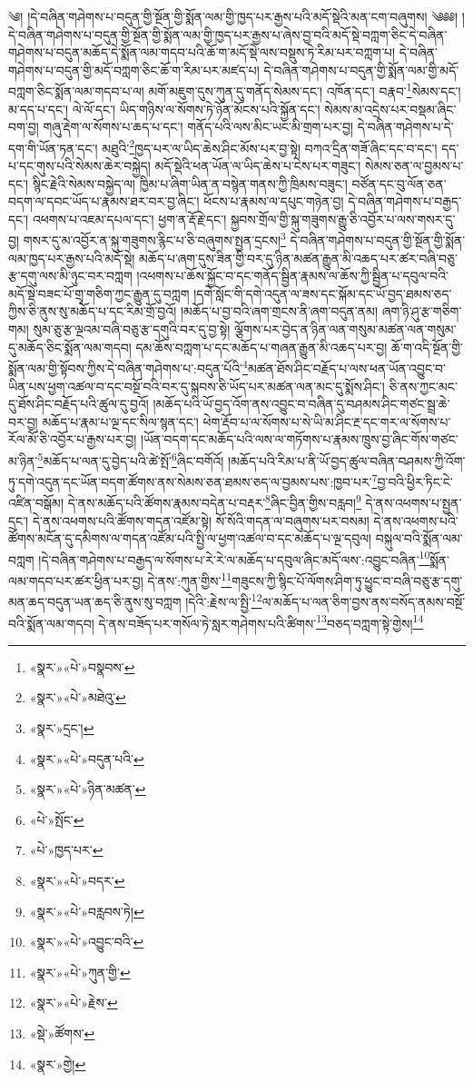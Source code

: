༄། །དེ་བཞིན་གཤེགས་པ་བདུན་གྱི་སྔོན་གྱི་སྨོན་ལམ་གྱི་ཁྱད་པར་རྒྱས་པའི་མདོ་སྡེའི་མན་ངག་བཞུགས། ༄༅༅། །དེ་བཞིན་གཤེགས་པ་བདུན་གྱི་སྔོན་གྱི་སྨོན་ལམ་གྱི་ཁྱད་པར་རྒྱས་པ་ཞེས་བྱ་བའི་མདོ་སྡེ་བཀླག་ཅིང་དེ་བཞིན་གཤེགས་པ་བདུན་མཆོད་དེ་སྨོན་ལམ་གདབ་པའི་ཆོ་ག་མདོ་སྡེ་ལས་བསྡུས་ཏེ་རིམ་པར་བཀླག་པ། དེ་བཞིན་གཤེགས་པ་བདུན་གྱི་མདོ་བཀླག་ཅིང་ཆོ་ག་རིམ་པར་མཛད་པ། དེ་བཞིན་གཤེགས་པ་བདུན་གྱི་སྨོན་ལམ་གྱི་མདོ་བཀླག་ཅིང་སྨོན་ལམ་གདབ་པ་ལ། མགོ་མཇུག་དུས་ཀུན་དུ་གནོད་སེམས་དང་། འཁོན་དང་། བརྣབ་\footnote{«སྣར་»«པེ་»བསྣབས་}སེམས་དང་། མ་དད་པ་དང་། ལེ་ལོ་དང་། ཡིད་གཉིས་ལ་སོགས་ཏེ་ཉོན་མོངས་པའི་སྐྱོན་དང་། སེམས་མ་འདྲེས་པར་བསྡམ་ཞིང་བག་བྱ། གཞུ་རྡེག་ལ་སོགས་པ་ཆད་པ་དང་། གནོད་པའི་ལས་མིང་ཡང་མི་གྲག་པར་བྱ། དེ་བཞིན་གཤེགས་པ་དེ་དག་གི་ཡོན་ཏན་དང་། མཐུའི་\footnote{«སྣར་»«པེ་»མཐེའུ་}ཁྱད་པར་ལ་ཡིད་ཆེས་ཤིང་མོས་པར་བྱ་སྟེ། བཀའ་དྲིན་གཟོ་ཞིང་དང་བ་དང་། དད་པ་དང་གུས་པའི་སེམས་ཆེར་བསྐྱེད། མདོ་སྡེའི་ཕན་ཡོན་ལ་ཡིད་ཆེས་པ་ངེས་པར་གཟུང་། སེམས་ཅན་ལ་བྱམས་པ་དང་། སྙིང་རྗེའི་སེམས་བསྐྱེད་ལ། ཁྱིམ་པ་ཞིག་ཡིན་ན་བསྙེན་གནས་ཀྱི་ཁྲིམས་བཟུང་། བཙོན་དང་བུ་ལོན་ཅན་བདག་ལ་དབང་ཡོད་པ་རྣམས་ཐར་བར་བྱ་ཞིང་། ཕོངས་པ་རྣམས་ལ་དཔུང་གཉེན་བྱ། དེ་བཞིན་གཤེགས་པ་བརྒྱད་དང་། འཕགས་པ་འཇམ་དཔལ་དང་། ཕྱག་ན་རྡོ་རྗེ་དང་། སྐྱབས་གྲོལ་གྱི་སྐུ་གཟུགས་རྒྱུ་ཅི་འབྱོར་པ་ལས་གསར་དུ་བྱ། གསར་དུ་མ་འབྱོར་ན་སྐུ་གཟུགས་རྙིང་པ་ཅི་བཞུགས་སྤྱན་དྲངས།\footnote{«སྣར་»དྲང་།} དེ་བཞིན་གཤེགས་པ་བདུན་གྱི་སྔོན་གྱི་སྨོན་ལམ་ཁྱད་པར་རྒྱས་པའི་མདོ་སྡེ། མཆོད་པ་ཞག་དུས་ཟིན་གྱི་བར་དུ་ཉིན་མཚན་རྒྱུན་མི་འཆད་པར་ཚར་བཞི་བཅུ་རྩ་དགུ་ལས་མི་ཉུང་བར་བཀླག །འཕགས་པ་ཆོས་སྐྱོང་བ་དང་གནོད་སྦྱིན་རྣམས་ལ་ཆོས་ཀྱི་སྦྱིན་པ་དབུལ་བའི་མདོ་སྡེ་བཟང་པོ་གྲྭ་གཅིག་ཀྱང་རྒྱུན་དུ་བཀླག །དགེ་སློང་གི་དགེ་འདུན་ལ་ཟས་དང་སྐོམ་དང་ཡོ་བྱད་ཐམས་ཅད་ཀྱིས་ཅི་ནུས་སུ་མཆོད་པ་དང་རིམ་གྲོ་བྱའོ། །མཆོད་པ་བྱ་བའི་ཞག་གྲངས་ནི་ཞག་བདུན་ནམ། ཞག་ཉི་ཤུ་རྩ་གཅིག་གམ། སུམ་ཅུ་རྩ་ལྔའམ་བཞི་བཅུ་རྩ་དགུའི་བར་དུ་བྱ་སྟེ། ལྕོགས་པར་བྱེད་ན་ཉིན་ལན་གསུམ་མཚན་ལན་གསུམ་དུ་མཆོད་ཅིང་སྨོན་ལམ་གདབ། དམ་ཆོས་བཀླག་པ་དང་མཆོད་པ་གཞན་རྒྱུན་མི་འཆད་པར་བྱ། ཆོ་ག་འདི་སྔོན་གྱི་སྨོན་ལམ་གྱི་སྟོབས་ཀྱིས་དེ་བཞིན་གཤེགས་པ་:བདུན་པོའི་\footnote{«སྣར་»«པེ་»བདུན་པའི་}མཚན་ཐོས་ཤིང་བརྗོད་པ་ལས་ཕན་ཡོན་འབྱུང་བ་ཡིན་པས་ཕྱག་འཚལ་བ་དང་བསྔོ་བའི་བར་དུ་སྐབས་ཅི་ཡོད་པར་མཚན་ལན་མང་དུ་སྨོས་ཤིང་། ཅི་ནས་ཀྱང་མང་དུ་ཐོས་ཤིང་བརྗོད་པའི་ཚུལ་དུ་བྱའོ། །མཆོད་པའི་ཡོ་བྱད་འོག་ནས་འབྱུང་བ་བཞིན་དུ་བཤམས་ཤིང་གཙང་སྦྲ་ཆེ་བར་བྱ། མཆོད་པ་རྣམ་པ་ལྔ་དང་སིལ་སྙན་དང་། ཕེག་རྡོབ་པ་ལ་སོགས་པ་སེ་ཡི་མ་ཤིང་རྔ་དང་གར་ལ་སོགས་པ་རོལ་མོ་ཅི་འབྱོར་པ་རྒྱས་པར་བྱ། །ཡོན་བདག་དང་མཆོད་པའི་ལས་ལ་གཏོགས་པ་རྣམས་ཁྲུས་བྱ་ཞིང་གོས་གཙང་མ་ཉིན་\footnote{«སྣར་»«པེ་»ཉིན་མཚན་}མཆོད་པ་ལན་དུ་བྱེད་པའི་ཚེ་སྤོ་\footnote{«པེ་»སྤོང་}ཞིང་བགོའོ། །མཆོད་པའི་རིམ་པ་ནི་ཡོ་བྱད་ཚུལ་བཞིན་བཤམས་ཀྱི་འོག་ཏུ་དགེ་འདུན་དང་ཡོན་བདག་ཚོགས་ནས་སེམས་ཅན་ཐམས་ཅད་ལ་བྱམས་པས་:ཁྱབ་པར་\footnote{«པེ་»ཁྱད་པར་}བྱ་བའི་ཕྱིར་ཏིང་ངེ་འཛིན་བསྒོམ། དེ་ནས་མཆོད་པའི་ཚོགས་རྣམས་བདེན་པ་བརྡར་\footnote{«སྣར་»«པེ་»བདར་}ཞིང་བྱིན་གྱིས་བརླབ།\footnote{«སྣར་»«པེ་»བརླབས་ཏེ།} དེ་ནས་འཕགས་པ་སྤྱན་དྲང་། དེ་ནས་འཕགས་པའི་ཚོགས་གདན་འཛོམ་སྟེ། སོ་སོའི་གདན་ལ་བཞུགས་པར་བསམ། དེ་ནས་འཕགས་པའི་ཚོགས་མངོན་དུ་དམིགས་ལ་གདན་འཛོམ་པའི་སྤྱི་ལ་ཕྱག་འཚལ་བ་དང་མཆོད་པ་ལྔ་དབུལ། བསྐུལ་བའི་སྨོན་ལམ་བཀླག །དེ་བཞིན་གཤེགས་པ་བརྒྱད་ལ་སོགས་པ་རེ་རེ་ལ་མཆོད་པ་དབུལ་ཞིང་མདོ་ལས་:འབྱུང་བཞིན་\footnote{«སྣར་»«པེ་»འབྱུང་བའི་}སྨོན་ལམ་གདབ་པར་ཚར་ཕྱིན་པར་བྱ། དེ་ནས་:ཀུན་གྱིས་\footnote{«སྣར་»«པེ་»ཀུན་གྱི་}གཟུངས་ཀྱི་སྙིང་པོ་ལོགས་ཤིག་ཏུ་ཕྱུང་བ་བཞི་བཅུ་རྩ་དགུ་མན་ཆད་བདུན་ཡན་ཆད་ཅི་ནུས་སུ་བཀླག །དེའི་:རྗེས་ལ་སྤྱི་\footnote{«སྣར་»«པེ་»རྗེས་}ལ་མཆོད་པ་ལན་ཅིག་བྱས་ནས་བསོད་ནམས་བསྔོ་བའི་སྨོན་ལམ་གདབ། དེ་ནས་བཟོད་པར་གསོལ་ཏེ་སླར་གཤེགས་པའི་ཚིགས་\footnote{«སྡེ་»ཚོགས་}བཅད་བཀླག་སྟེ་གྱེས།\footnote{«སྣར་»གྱེ།} 